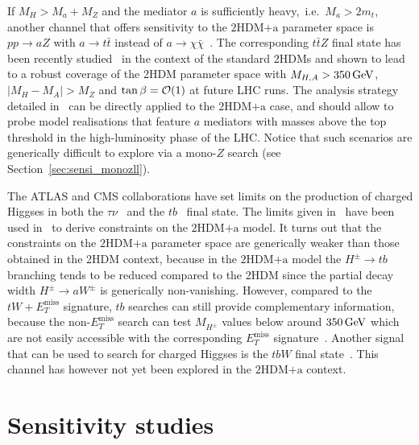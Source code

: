 \documentclass[a4paper, 11pt,notoc]{article}
\newcommand{\MET}{\ensuremath{E_T^\mathrm{miss}}\xspace}
\newcommand{\ma}{\ensuremath{M_{a}}\xspace}
\newcommand{\mH}{\ensuremath{M_{H}}\xspace}
\newcommand{\mHc}{\ensuremath{M_{H^{\pm}}}\xspace}
\newcommand{\hdma}{\ensuremath{\textrm{2HDM+a}}\xspace}
\begin{document}
If $\mH > \ma + M_Z$ and the mediator $a$ is sufficiently heavy,~i.e.~$\ma > 2 m_t$, another channel that offers sensitivity to the  $\hdma$ parameter space is $pp \to aZ$ with $a \to t \bar t$ instead of $a \to \chi \bar \chi$~\cite{GPHeidelberg}. {\color{blue} The corresponding $t \bar t Z$ final state has been recently studied~\cite{Haisch:2018djm} in the context of the standard 2HDMs and shown to lead to a robust coverage of the 2HDM parameter space with $M_{H,A} > 350 \, {\rm GeV}$, $|M_H - M_A| > M_Z$ and $\tan \beta = {\cal O} (1)$ at future LHC runs.}  The analysis strategy detailed in~\cite{Haisch:2018djm} can be directly applied to the \hdma case, and should allow to probe model realisations that feature $a$ mediators with masses above the top threshold in the high-luminosity phase of the LHC. Notice that such scenarios are generically difficult to explore via a mono-$Z$ search (see Section~\ref{sec:sensi_monozll}).

The ATLAS and CMS collaborations have set limits on the production of charged Higgses in both the $\tau \nu$~\cite{Aaboud:2016dig,CMS-PAS-HIG-16-031} and the $tb$~\cite{Aad:2015typ,Khachatryan:2015qxa,ATLAS:2016qiq} final state. The limits given in~\cite{ATLAS:2016qiq} have been used in~\cite{Pani:2017qyd} to derive constraints on the \hdma model. It turns out that  the constraints on the \hdma parameter space are generically weaker than those obtained in the 2HDM context, because in the \hdma model  the $H^\pm \to tb$ branching tends to be reduced compared to the 2HDM since the partial decay width $H^\pm \to aW^\pm$ is generically non-vanishing.  However, compared to the $tW+\MET$ signature, $tb$ searches can still provide complementary information, because the non-$\MET$  search can test $\mHc$ values below around $350 \, {\rm GeV}$ which are not easily accessible with the corresponding $\MET$ signature~\cite{Pani:2017qyd}. Another signal that can be used to search for charged Higgses is the $tbW$ final state~\cite{Haisch:2018djm}. This channel has however not yet been explored in the \hdma context. 


\section{Sensitivity studies}
\label{sec:sensitivitystudies}
\end{document}

